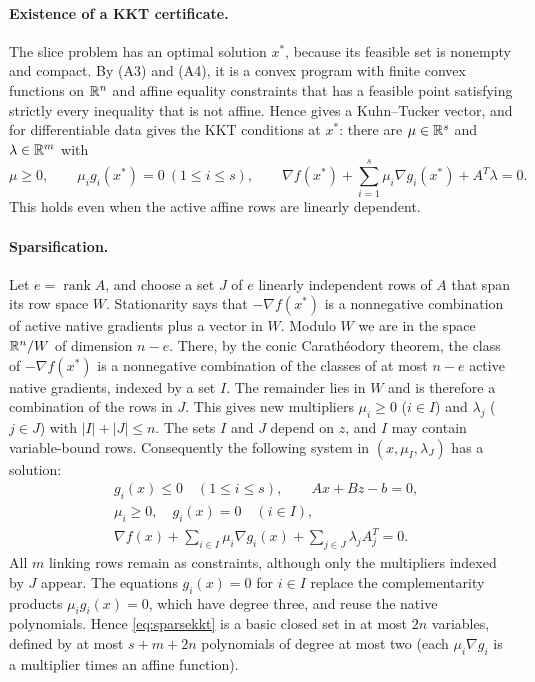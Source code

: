 \paragraph{Existence of a KKT certificate.}
The slice problem has an optimal solution $x^*$, because its feasible
set is nonempty and compact. By (A3) and (A4), it is a convex program
with finite convex functions on $\mathbb R^n$ and affine equality constraints
that has a feasible point satisfying strictly every inequality that is
not affine. Hence \citet[Theorem~28.2]{Rockafellar1970} gives a
Kuhn--Tucker vector, and for differentiable data
\citet[Theorem~28.3]{Rockafellar1970} gives the KKT conditions at $x^*$:
there are $\mu\in\mathbb R^s$ and $\lambda\in\mathbb R^m$ with
\[
 \mu\ge0,\qquad \mu_ig_i(x^*)=0\ (1\le i\le s),\qquad
 \nabla f(x^*)+\sum_{i=1}^s\mu_i\nabla g_i(x^*)+A^T\lambda=0.
\]
This holds even when the active affine rows are linearly dependent.

\paragraph{Sparsification.}
Let $e=\operatorname{rank}A$, and choose a set $J$ of $e$ linearly
independent rows of $A$ that span its row space $W$. Stationarity says
that $-\nabla f(x^*)$ is a nonnegative combination of active native
gradients plus a vector in $W$. Modulo $W$ we are in the space
$\mathbb R^n/W$ of dimension $n-e$. There, by the conic Carath\'eodory theorem,
the class of $-\nabla f(x^*)$ is a nonnegative combination of the
classes of at most $n-e$ active native gradients, indexed by a set $I$.
The remainder lies in $W$ and is therefore a combination of the rows in
$J$. This gives new multipliers $\mu_i\ge0$ ($i\in I$) and $\lambda_j$
($j\in J$) with $|I|+|J|\le n$. The sets $I$ and $J$ depend on $z$, and
$I$ may contain variable-bound rows. Consequently the following system
in $(x,\mu_I,\lambda_J)$ has a solution:
\begin{equation}\label{eq:sparsekkt}
 \begin{aligned}
 &g_i(x)\le0\quad(1\le i\le s),\qquad Ax+Bz-b=0,\\
 &\mu_i\ge0,\quad g_i(x)=0\quad(i\in I),\\
 &\nabla f(x)+\sum_{i\in I}\mu_i\nabla g_i(x)
                  +\sum_{j\in J}\lambda_j A_j^T=0.
 \end{aligned}
\end{equation}
All $m$ linking rows remain as constraints, although only the
multipliers indexed by $J$ appear. The equations $g_i(x)=0$ for $i\in I$
replace the complementarity products $\mu_ig_i(x)=0$, which have degree
three, and reuse the native polynomials. Hence \eqref{eq:sparsekkt} is a
basic closed set in at most $2n$ variables, defined by at most $s+m+2n$
polynomials of degree at most two (each $\mu_i\nabla g_i$ is a multiplier
times an affine function).

